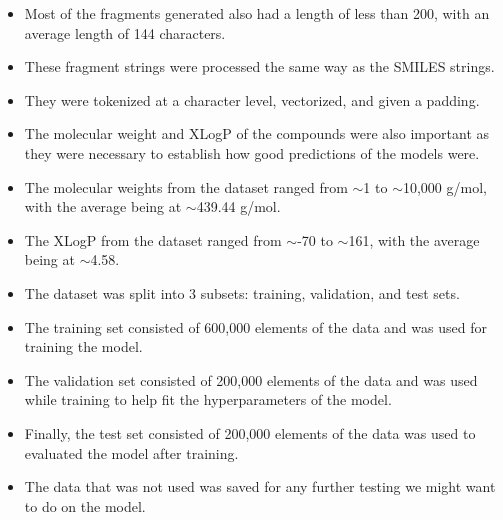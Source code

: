 \begin{itemize}
            \item Most of the fragments generated also had a length of less than 200, with an average length of 144 characters. 
            \item These fragment strings were processed the same way as the SMILES strings.
            \item They were tokenized at a character level, vectorized, and given a padding.
            \item The molecular weight and XLogP of the compounds were also important as they were necessary to establish how good predictions of the models were.
            \item The molecular weights from the dataset ranged from $\sim$1 to $\sim$10,000 g/mol, with the average being at $\sim$439.44 g/mol.
            \item The XLogP from the dataset ranged from $\sim$-70 to $\sim$161, with the average being at $\sim$4.58.
            \item The dataset was split into 3 subsets: training, validation, and test sets. 
            \item The training set consisted of 600,000 elements of the data and was used for training the model.
            \item The validation set consisted of 200,000 elements of the data and was used while training to help fit the hyperparameters of the model.
            \item Finally, the test set consisted of 200,000 elements of the data was used to evaluated the model after training.
            \item The data that was not used was saved for any further testing we might want to do on the model.
        \end{itemize}
